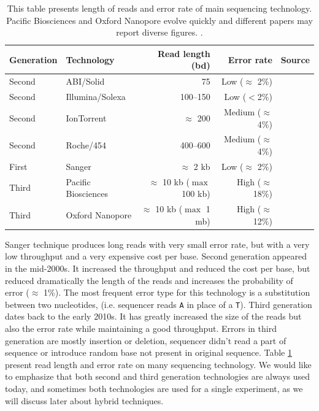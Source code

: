 \documentclass[./main.tex]{subfiles}
\begin{document}
\begin{table}[ht]
    \centering
    \begin{tabular}{ll|rr|l}
Generation & Technology          & Read length (bd)                 & Error rate             & Source                          \\ \hline
Second     & ABI/Solid           & 75                               & Low ($\approx$ 2\%)    & \cite{seq_assembly_demystified} \\
Second     & Illumina/Solexa     & 100–150                          & Low ($<$2\%)             & \cite{seq_assembly_demystified} \\
Second     & IonTorrent          & $\approx$ 200                    & Medium ($\approx$ 4\%) & \cite{seq_assembly_demystified} \\
Second     & Roche/454           & 400–600                          & Medium ($\approx$ 4\%) & \cite{seq_assembly_demystified} \\
First      & Sanger              & $\approx$ 2 kb                   & Low ($\approx$ 2\%)    & \cite{seq_assembly_demystified} \\
Third      & Pacific Biosciences & $\approx$ 10 kb ($\max$ 100 kb)  & High ($\approx$ 18\%)  & \cite{seq_assembly_demystified} \cite{longread_dark_matter} \\
Third      & Oxford Nanopore     & $\approx$ 10 kb ($\max$ 1 mb)    & High ($\approx$ 12\%)  & \cite{longread_dark_matter} \cite{nanopore_read_accuracy} \\
    \end{tabular}
    \caption{This table presents length of reads and error rate of main sequencing technology. Pacific Biosciences and Oxford Nanopore evolve quickly and different papers may report diverse figures.
    .}
    \label{intro:tab:technology_property}
\end{table}

Sanger technique produces long reads with very small error rate, but with a very low throughput and a very expensive cost per base. %
Second generation appeared in the mid-2000s. It increased the throughput and reduced the cost per base, but reduced dramatically the length of the reads and increases the probability of error ($\approx$ 1\%).%
The most frequent error type for this technology is a substitution between two nucleotides, (i.e. sequencer reads \texttt{A} in place of a \texttt{T}).%
Third generation dates back to the early 2010s. It has greatly increased the size of the reads but also the error rate while maintaining a good throughput. %
Errors in third generation are mostly insertion or deletion, sequencer didn't read a part of sequence or introduce random base not present in original sequence. Table \ref{intro:tab:technology_property} present read length and error rate on many sequencing technology.%
We would like to emphasize that both second and third generation technologies are always used today, and sometimes both technologies are used for a single experiment, as we will discuss later about hybrid techniques. %
\end{document}
